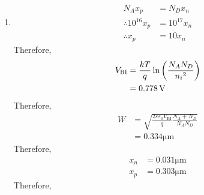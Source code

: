 \documentclass[titlepage, fleqn, a4paper, 12pt, twoside]{article}
\theoremstyle{definition}
\theoremstyle{theorem}
\begin{document}
\begin{solution}
	\begin{enumerate}[leftmargin=*]
		\item 
			\begin{align*}
				N_A x_p                & = N_D x_n     \\
				\therefore 10^{16} x_p & = 10^{17} x_n \\
				\therefore x_p         & = 10 x_n
			\end{align*}
			Therefore,
			\begin{align*}
				V_{\text{BI}} & = \frac{k T}{q} \ln\left( \frac{N_A N_D}{{n_i}^2} \right) \\
                                              & = 0.778 \volt
			\end{align*}
			Therefore,
			\begin{align*}
				W & = \sqrt{\frac{2 \varepsilon \varepsilon_0 V_{\text{BI}}}{q} \frac{N_A + N_D}{N_A N_D}} \\
                                  & = 0.334 \si{\micro\metre}
			\end{align*}
			Therefore,
			\begin{align*}
				x_n & = 0.031 \si{\micro\metre} \\
				x_p & = 0.303 \si{\micro\metre}
			\end{align*}
			Therefore,
			\begin{figure}[H]
				\centering
\end{figure}
\end{enumerate}
\end{solution}
\end{document}
